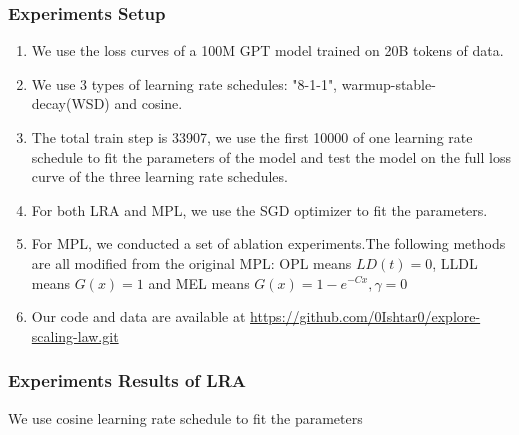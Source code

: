\documentclass[aspectratio=169]{beamer}
\begin{document}
    \begin{frame}
        \frametitle{Experiments Setup}
        \begin{enumerate}
            \item We use the loss curves of a 100M GPT model trained on
            20B tokens of data.
            \item We use 3 types of learning rate schedules: "8-1-1",
            warmup-stable-decay(WSD) and cosine.
            \item The total train step is 33907, we use the first 10000
            of one learning rate schedule to fit the parameters of
            the model and test the model on the full loss curve of
            the three learning rate schedules.
            \item For both LRA and MPL, we use the SGD optimizer to fit
            the parameters.
            \item For MPL, we conducted a set of ablation experiments.The
            following methods are all
            modified from the original MPL: OPL means $LD(t)=0$, LLDL
            means $G(x)=1$ and MEL means $G(x) = 1-e^{-Cx},\gamma = 0$
            \item Our code and data are available at
            \url{https://github.com/0Ishtar0/explore-scaling-law.git}
        \end{enumerate}
    \end{frame}

    \begin{frame}
        \frametitle{Experiments Results of LRA}
        We use cosine learning rate schedule to fit the parameters
        \begin{figure}
            \centering
            \label{fig:figure}
        \end{figure}
    \end{frame}
\end{document}
